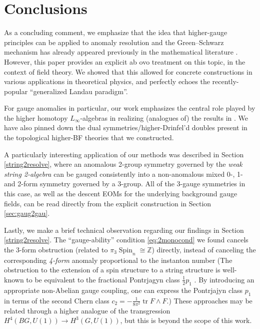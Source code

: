\documentclass[onecolumn]{article}
\theoremstyle{theorem}
\theoremstyle{remark}
\theoremstyle{example}
\theoremstyle{definition}
\numberwithin{equation}{section}
\begin{document}



\section{Conclusions}\label{conclusion}


As a concluding comment, we emphasize that the idea that higher-gauge principles can be applied to anomaly resolution and the Green--Schwarz mechanism has already appeared previously in the mathematical literature \cite{Schreiber:2013pra,Sati:2009ic,Fiorenza:2020iax}. However, this paper provides an explicit {ab ovo} %
 treatment on this topic, in the context of field theory. We showed that this allowed for concrete constructions in various applications in theoretical physics, and perfectly echoes the recently-popular ``generalized Landau paradigm''. 

For gauge anomalies in particular, our work emphasizes the central role played by the higher homotopy $L_\infty$-algebras in realizing (analogues of) the results in \cite{Cordova:2018cvg,Benini_2019}. We have also pinned down the dual symmetries/higher-Drinfel'd doubles present in the topological higher-BF theories that we constructed. 

A particularly interesting application of our methods was described in Section \ref{string2resolve}, where an anomalous 2-group symmetry governed by the \textit{{weak string 2-algebra}} can be gauged consistently into a non-anomalous mixed 0-, 1- and 2-form symmetry governed by a 3-group. All of the 3-gauge symmetries in this case, as well as the descent EOMs for the underlying background gauge fields, can be read directly from the explicit construction in Section \ref{sec:gaug2gau}.




Lastly, we make a brief technical observation regarding our findings in Section \ref{string2resolve}. The ``gauge-ability'' condition \eqref{eq:2monocond} we found cancels the 3-form obstruction (related to $\pi_3\operatorname{Spin}_n\cong\mathbb{Z}$) directly, instead of canceling the corresponding \textit{{4-form}} anomaly proportional to the instanton number {(The obstruction to the extension of a spin structure to a string structure is well-known to be equivalent to the fractional Pontrjagyn class $\frac{1}{2}p_1$} \cite{Sati:2008eg}. {By introducing an appropriate non-Abelian gauge coupling, one can express the Pontrjajyn class $p_1$  in terms of the second Chern class $c_2 = -\frac{1}{8\pi^2} \operatorname{tr}F\wedge F$.)} These approaches may be related through a higher analogue of the {{transgression}} $H^4(BG,U(1))\to H^3(G,U(1))$, but this is beyond the scope of this work.
\end{document}
